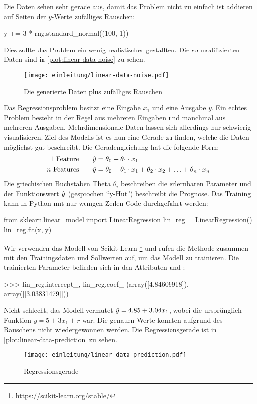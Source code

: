\noindent
Die Daten sehen sehr gerade aus, damit das Problem nicht zu einfach ist
addieren auf Seiten der $y$-Werte zufälliges Rauschen:
\begin{pythoncode}
y += 3 * rng.standard_normal((100, 1))
\end{pythoncode}
Dies sollte das Problem ein wenig realistischer gestallten.
Die so modifizierten Daten sind in \autoref{plot:linear-data-noise} zu sehen.
\newpage
\begin{figure}[!h]
  \centering
  \texttt{[image: einleitung/linear-data-noise.pdf]}
  \caption{Die generierte Daten plus zufälliges Rauschen}
  \label{plot:linear-data-noise}
\end{figure}
\noindent
Das Regressionsproblem besitzt eine Eingabe $x_1$ und eine Ausgabe $y$.
Ein echtes Problem besteht in der Regel aus mehreren Eingaben und manchmal
aus mehreren Ausgaben. Mehrdimensionale Daten lassen sich allerdings nur schwierig
visualisieren. Ziel des Modells ist es nun eine Gerade zu finden, welche die
Daten möglichst gut beschreibt. Die Geradengleichung hat die folgende Form:
\begin{align}
  \text{1 Feature}\qquad    & \hat{y} = \theta_0 + \theta_1 \cdot x_1   \\
  \text{$n$ Features}\qquad & \hat{y} = \theta_0 + \theta_1 \cdot x_1 +
  \theta_2 \cdot x_2 + \ldots + \theta_n \cdot x_n
\end{align}
Die griechischen Buchstaben Theta $\theta_i$ beschreiben die erlernbaren Parameter und
der Funktionswert $\hat{y}$ (gesprochen \enquote{y-Hut}) beschreibt die Prognose.
Das Training kann in Python mit nur wenigen Zeilen Code durchgeführt werden:
\begin{pythoncode}
from sklearn.linear_model import LinearRegression
lin_reg = LinearRegression()
lin_reg.fit(x, y)
\end{pythoncode}
Wir verwenden das  Modell von Scikit-Learn
\footnote{\url{https://scikit-learn.org/stable/}} und rufen die 
Methode zusammen mit den Trainingsdaten und Sollwerten auf, um das Modell zu trainieren.
Die trainierten Parameter befinden sich in den Attributen 
und :
\begin{pyconcode}
>>> lin_reg.intercept_, lin_reg.coef_
(array([4.84609918]), array([[3.03831479]]))
\end{pyconcode}
Nicht schlecht, das Modell vermutet $\hat{y} = 4.85 + 3.04x_1$, wobei die ursprünglich
Funktion $y = 5 + 3x_1 + r$ war. Die genauen Werte konnten aufgrund des Rauschens
nicht wiedergewonnen werden. Die Regressionsgerade ist
in \autoref{plot:linear-data-prediction} zu sehen.
\begin{figure}[!h]
  \centering
  \texttt{[image: einleitung/linear-data-prediction.pdf]}
  \caption{Regressionsgerade}
  \label{plot:linear-data-prediction}
\end{figure}

